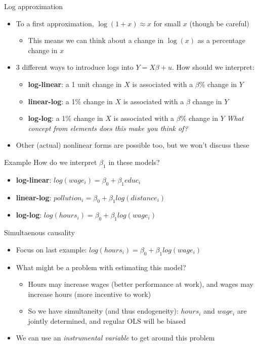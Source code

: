 \documentclass[aspectratio=169]{beamer}
\begin{document}
\begin{frame}{Log approximation}
    \begin{itemize}
        \item To a first approximation, $\log(1+x) \approx x$ for small $x$ (though be careful)
        \begin{itemize}
            \item This means we can think about a change in $\log(x)$ as a percentage change in $x$
        \end{itemize}
        \item 3 different ways to introduce logs into $Y=X\beta + u$. How should we interpret:
        \begin{itemize}
            \item \textbf{log-linear}: a 1 unit change in $X$ is associated with a $\beta \%$ change in $Y$
            \item \textbf{linear-log}: a 1\% change in $X$ is associated with a $\beta$ change in $Y$
            \item \textbf{log-log}: a 1\% change in $X$ is associated with a $\beta \%$ change in $Y$ \textit{What concept from elements does this make you think of?}
        \end{itemize}
        \item Other (actual) nonlinear forms are possible too, but we won't discuss these
    \end{itemize}
\end{frame}

\begin{frame}{Example}
    How do we interpret $\beta_1$ in these models?
    \begin{itemize}
        \item \textbf{log-linear}: $log(wage_i) = \beta_0 + \beta_1 educ_i$
        \item \textbf{linear-log}: $pollution_i = \beta_0 + \beta_1 log(distance_i)$
        \item \textbf{log-log}: $log(hours_i) = \beta_0 + \beta_1 log(wage_i)$
    \end{itemize}
\end{frame}

\begin{frame}{Simultaenous causality}
    \begin{itemize}
        \item Focus on last example: $log(hours_i) = \beta_0 + \beta_1 log(wage_i)$
        \item What might be a problem with estimating this model?
        \pause
        \begin{itemize}
            \item Hours may increase wages (better performance at work), and wages may increase hours (more incentive to work)
            \item So we have simultaneity (and thus endogeneity): $hours_i$ and $wage_i$ are jointly determined, and regular OLS will be biased
        \end{itemize}
        \item We can use an \textit{instrumental variable} to get around this problem
    \end{itemize}
\end{frame}
\end{document}
